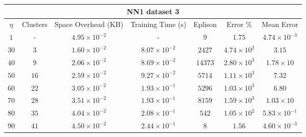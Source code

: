 \begin{adjustwidth}{-1cm}{}
\begin{tabular}{ccccccc}
\hline
\multicolumn{7}{c}{NN1 dataset 3} \\
\toprule
$\eta$ & Clusters & Space Overhead (KB) & Training Time (s) & Eplison & Error \% & Mean Error\\
\midrule
$1$ & - & $4.95 \times 10^{-2}$ & - & $9$ & $1.75$ & $4.74 \times 10^{-3}$\\
$30$ & $3$ & $1.60 \times 10^{-2}$ & $8.07 \times 10^{-2}$ & $2427$ & $4.74 \times 10^2$ & $3.15$\\
$40$ & $9$ & $2.06 \times 10^{-2}$ & $8.69 \times 10^{-2}$ & $14373$ & $2.80 \times 10^3$ & $1.78 \times 10$\\
$50$ & $16$ & $2.59 \times 10^{-2}$ & $9.27 \times 10^{-2}$ & $5714$ & $1.11 \times 10^3$ & $7.32$\\
$60$ & $22$ & $3.05 \times 10^{-2}$ & $1.93 \times 10^{-1}$ & $5296$ & $1.03 \times 10^3$ & $6.80$\\
$70$ & $28$ & $3.51 \times 10^{-2}$ & $1.93 \times 10^{-1}$ & $8159$ & $1.59 \times 10^3$ & $1.03 \times 10$\\
$80$ & $35$ & $4.04 \times 10^{-2}$ & $2.08 \times 10^{-1}$ & $542$ & $1.05 \times 10^2$ & $5.83 \times 10^{-1}$\\
$90$ & $41$ & $4.50 \times 10^{-2}$ & $2.44 \times 10^{-1}$ & $8$ & $1.56$ & $4.60 \times 10^{-3}$\\
\bottomrule
\end{tabular}
\end{adjustwidth}

\par\null\par
\par\null\par


